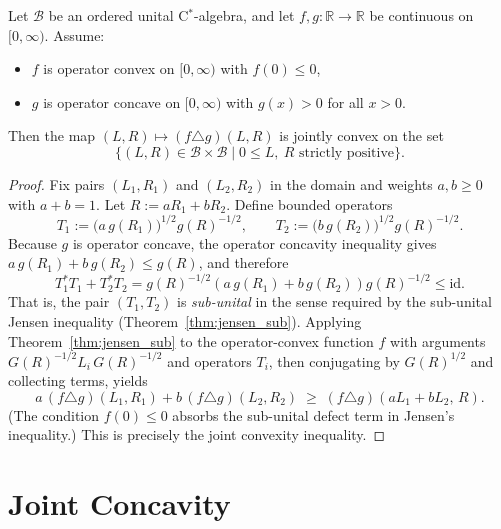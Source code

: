 \begin{theorem}
  \label{thm:perspective_joint_convex}
  \leanok
  Let $\mathcal{B}$ be an ordered unital C$^*$-algebra, and let
  $f, g : \mathbb{R} \to \mathbb{R}$ be continuous on $[0,\infty)$.
  Assume:
  \begin{itemize}
    \item $f$ is operator convex on $[0,\infty)$ with $f(0) \leq 0$,
    \item $g$ is operator concave on $[0,\infty)$ with $g(x) > 0$ for all $x > 0$.
  \end{itemize}
  Then the map $(L, R) \mapsto (f \triangle g)(L, R)$ is jointly convex on the set
  \[
    \{ (L, R) \in \mathcal{B} \times \mathcal{B} \mid 0 \leq L,\ R \text{ strictly positive} \}.
  \]
  \begin{proof}
    \leanok
    Fix pairs $(L_1, R_1)$ and $(L_2, R_2)$ in the domain and weights $a, b \geq 0$
    with $a + b = 1$.
    Let $R := a R_1 + b R_2$.
    Define bounded operators
    \[
      T_1 := \bigl(a\, g(R_1)\bigr)^{1/2} g(R)^{-1/2},
      \qquad
      T_2 := \bigl(b\, g(R_2)\bigr)^{1/2} g(R)^{-1/2}.
    \]
    Because $g$ is operator concave, the operator concavity inequality gives
    $a\, g(R_1) + b\, g(R_2) \leq g(R)$, and therefore
    \[
      T_1^* T_1 + T_2^* T_2
      = g(R)^{-1/2}(a\, g(R_1) + b\, g(R_2))g(R)^{-1/2}
      \leq \mathrm{id}.
    \]
    That is, the pair $(T_1, T_2)$ is \emph{sub-unital} in the sense required by
    the sub-unital Jensen inequality (Theorem~\ref{thm:jensen_sub}).
    Applying Theorem~\ref{thm:jensen_sub} to the operator-convex function $f$
    with arguments $G(R)^{-1/2} L_i\, G(R)^{-1/2}$ and operators $T_i$, then
    conjugating by $G(R)^{1/2}$ and collecting terms, yields
    \[
      a\,(f \triangle g)(L_1, R_1) + b\,(f \triangle g)(L_2, R_2)
      \;\geq\;
      (f \triangle g)(aL_1 + bL_2,\, R).
    \]
    (The condition $f(0) \leq 0$ absorbs the sub-unital defect term in Jensen's
    inequality.)
    This is precisely the joint convexity inequality.
  \end{proof}
\end{theorem}

\section{Joint Concavity}

